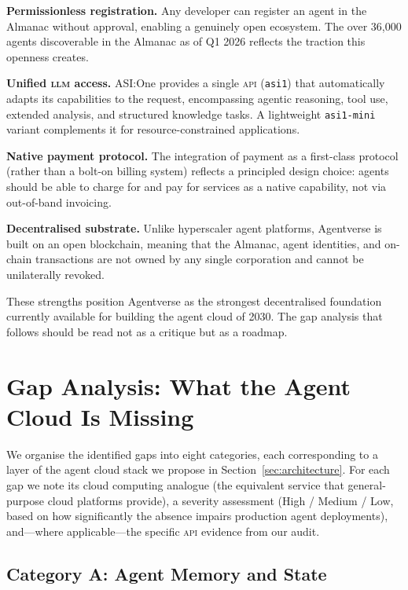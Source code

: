 \documentclass[twoside,11pt]{article}
\begin{document}
\textbf{Permissionless registration.} Any developer can register an agent in
the Almanac without approval, enabling a genuinely open ecosystem.  The over
36,000 agents discoverable in the Almanac as of Q1 2026 reflects the traction
this openness creates.

\textbf{Unified \textsc{llm} access.} ASI:One provides a single \textsc{api}
(\texttt{asi1}) that automatically adapts its capabilities to the request,
encompassing agentic reasoning, tool use, extended analysis, and structured
knowledge tasks.  A lightweight \texttt{asi1-mini} variant complements it for
resource-constrained applications.

\textbf{Native payment protocol.} The integration of payment as a first-class
protocol (rather than a bolt-on billing system) reflects a principled design
choice: agents should be able to charge for and pay for services as a native
capability, not via out-of-band invoicing.

\textbf{Decentralised substrate.} Unlike hyperscaler agent platforms,
Agentverse is built on an open blockchain, meaning that the Almanac, agent
identities, and on-chain transactions are not owned by any single corporation
and cannot be unilaterally revoked.

These strengths position Agentverse as the strongest decentralised foundation
currently available for building the agent cloud of 2030.  The gap analysis
that follows should be read not as a critique but as a roadmap.

\section{Gap Analysis: What the Agent Cloud Is Missing}
\label{sec:gaps}

We organise the identified gaps into eight categories, each corresponding to a
layer of the agent cloud stack we propose in Section~\ref{sec:architecture}.
For each gap we note its cloud computing analogue (the equivalent service that
general-purpose cloud platforms provide), a severity assessment (High /
Medium / Low, based on how significantly the absence impairs production agent
deployments), and---where applicable---the specific \textsc{api} evidence from
our audit.

\subsection{Category A: Agent Memory and State}
\label{subsec:gap-memory}
\end{document}
